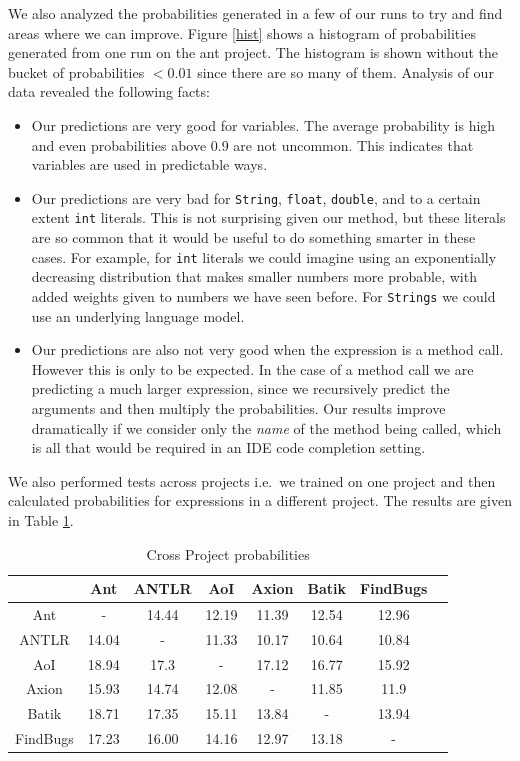 \documentclass{article} %
\begin{document}
We also analyzed the probabilities generated in a few of our runs to try and find areas where we can improve. Figure \ref{hist} shows a histogram of probabilities generated from one run on the ant project. The histogram is shown without the bucket of probabilities $< 0.01$ since there are so many of them. Analysis of our data revealed the following facts:

\begin{itemize}
  \item Our predictions are very good for variables. The average probability is high and even probabilities above 0.9 are not uncommon. This indicates that variables are used in predictable ways.
  \item Our predictions are very bad for \texttt{String}, \texttt{float}, \texttt{double}, and to a certain extent \texttt{int} literals. This is not surprising given our method, but these literals are so common that it would be useful to do something smarter in these cases. For example, for \texttt{int} literals we could imagine using an exponentially decreasing distribution that makes smaller numbers more probable, with added weights given to numbers we have seen before. For \texttt{Strings} we could use an underlying language model.
  \item Our predictions are also not very good when the expression is a method call. However this is only to be expected. In the case of a method call we are predicting a much larger expression, since we recursively predict the arguments and then multiply the probabilities. Our results improve dramatically if we consider only the \emph{name} of the method being called, which is all that would be required in an IDE code completion setting.
\end{itemize}

We also performed tests across projects i.e.\ we trained on one project and then calculated probabilities for expressions in a different project. The results are given in Table \ref{tab:cross}.

\begin{table}[h]
\centering
\begin{tabular}{|c|c|c|c|c|c|c|c|}
\hline
           & Ant   & ANTLR & AoI   & Axion & Batik & FindBugs \\
\hline
 Ant       & -     & 14.44 & 12.19 & 11.39 & 12.54 & 12.96    \\
ANTLR      & 14.04 & -     & 11.33 & 10.17 & 10.64 & 10.84    \\
AoI        & 18.94 & 17.3  & -     & 17.12 & 16.77 & 15.92    \\
Axion      & 15.93 & 14.74 & 12.08 & -     & 11.85 & 11.9     \\
Batik      & 18.71 & 17.35 & 15.11 & 13.84 & -     & 13.94    \\
FindBugs   & 17.23 & 16.00 & 14.16 & 12.97 & 13.18 & -        \\
\hline
\end{tabular}
\caption{Cross Project probabilities}
\label{tab:cross}
\end{table}
\end{document}
